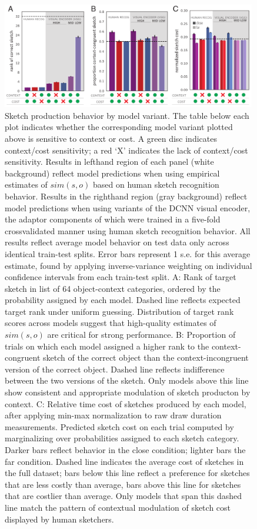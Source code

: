 \documentclass[9pt,twocolumn,twoside]{pnas-new}
\begin{document}
\begin{figure}[htbp]
\centering
\includegraphics[width=0.99\textwidth]{figures/5_model_results_2.pdf}
\caption{Sketch production behavior by model variant. The table below each plot indicates whether the corresponding model variant plotted above is sensitive to context or cost. 
A green disc indicates context/cost sensitivity; a red `X' indicates the lack of context/cost sensitivity. 
Results in lefthand region of each panel (white background) reflect model predictions when using empirical estimates of $sim(s,o)$ based on human sketch recognition behavior. 
Results in the righthand region (gray background) reflect model predictions when using variants of the DCNN visual encoder, the adaptor components of which were trained in a five-fold crossvalidated manner using human sketch recognition behavior. 
All results reflect average model behavior on test data only across identical train-test splits. 
Error bars represent 1 s.e. for this average estimate, found by applying inverse-variance weighting on individual confidence intervals from each train-test split. 
A: Rank of target sketch in list of 64 object-context categories, ordered by the probability assigned by each model. 
Dashed line reflects expected target rank under uniform guessing. 
Distribution of target rank scores across models suggest that high-quality estimates of $sim(s,o)$ are critical for strong performance. 
B: Proportion of trials on which each model assigned a higher rank to the context-congruent sketch of the correct object than the context-incongruent version of the correct object. 
Dashed line reflects indifference between the two versions of the sketch. 
Only models above this line show consistent and appropriate modulation of sketch producton by context. C: Relative time cost of sketches produced by each model, after applying min-max normalization to raw draw duration measurements. 
Predicted sketch cost on each trial computed by marginalizing over probabilities assigned to each sketch category. 
Darker bars reflect behavior in the close condition; lighter bars the far condition. 
Dashed line indicates the average cost of sketches in the full dataset; bars below this line reflect a preference for sketches that are less costly than average, bars above this line for sketches that are costlier than average. 
Only models that span this dashed line match the pattern of contextual modulation of sketch cost displayed by human sketchers.}
\label{model_results}
\end{figure}
\end{document}
